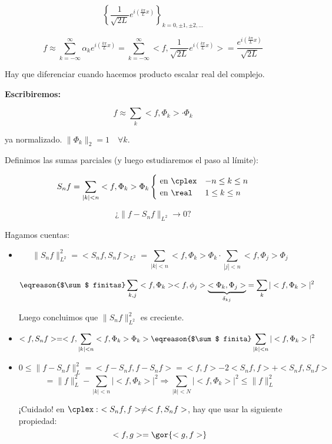 		\[
			\left\{ \frac{1}{\sqrt{2L}} e^{i \left( \frac{k \pi}{L} x \right)} \right\}_{k = 0, ±1, ±2, …}
		\]

		\[
		f ≈ \sum_{k=-\infty}^\infty \alpha_k e^{i \left( \frac{k \pi}{L} x \right)} = \sum_{k = -\infty}^\infty < f, \frac{1}{\sqrt{2L}} e^{i \left( \frac{k \pi}{L} x \right)} > = \frac{e^{i \left( \frac{k \pi}{L} x \right)}}{\sqrt{2L}}
		\]

		\obs Hay que diferenciar cuando hacemos producto escalar real del complejo.

		\textbf{Escribiremos:}

		\[ f ≈ \sum_k <f, \Phi_k> \cdot \Phi_k \]

		ya normalizado. $\|\Phi_k\|_2 = 1 \quad \forall k$.

		Definimos las sumas parciales (y luego estudiaremos el paso al límite):

		\[
		S_n f = \sum_{|k| < n} <f, \Phi_k> \Phi_k \begin{cases}
			\text{ en } \cplex & -n \leq k \leq n \\
			\text{ en } \real & 1 \leq k \leq n
		\end{cases}
		\]

		\[ \text{¿} \| f - S_n f \|_{L^2} \rightarrow 0 \text{?}\]

		Hagamos cuentas:

		\begin{itemize}

			\item
			\[ \|S_n f\|_{L^2}^2 = < S_n f, S_n f>_{L^2} = \sum_{|k| < n} <f, \Phi_k> \Phi_k \cdot \sum_{|j| < n} <f, \Phi_j> \Phi_j \]

			\[ \eqreason{$\sum$ finitas} \sum_{k,j} <f, \Phi_k><f, \phi_j>\underbrace{<\Phi_k, \Phi_j>}_{\delta_{kj}} = \sum_k | <f, \Phi_k> |^2
			\]

			Luego concluimos que $\|S_n f\|_{L^2}^2$ es creciente.

			\item
			\[
				<f, S_n f> = <f, \sum_{|k| < n} <f, \Phi_k> \Phi_k > \eqreason{$\sum$ finita} \sum_{|k| < n} | <f, \Phi_k> |^2
			\]

			\item
			\[
				0 \leq \|f - S_n f\|^2_{L} = <f - S_n f, f- S_n f> = <f,f> - 2 <S_n f, f> + <S_n f, S_n f>
			\]
			\[ = \|f\|_{L}^2 - \sum_{|k| < n} |<f, \Phi_k>|^2 \Rightarrow \sum_{|k| < N} |<f, \Phi_k>|^2 \leq \|f\|_L^2 \]

			\obs ¡Cuidado! en $\cplex: \ <S_n f, f> \neq < f, S_n f>$, hay que usar la siguiente propiedad:
			$$<f,g> = \gor{<g,f>} $$
		\end{itemize}

